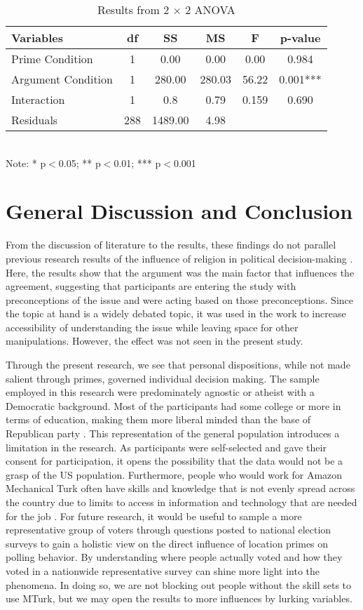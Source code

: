 \documentclass[letterpaper,man,natbib,noextraspace,12pt]{apa6}  %
\newcommand\tb{\textbf}
\begin{document}
\begin{table}
	\caption{Results from 2 $\times$ 2 ANOVA}\label{AnovaResults}
	\begin{tabular}{lccccc}
		\hline
		\tb{Variables}&\tb{df}&\tb{SS}&\tb{MS}&\tb{F}&\tb{p-value}\\
		\hline
		Prime Condition&1&0.00&0.00&0.00&0.984\\
		Argument Condition&1&280.00&280.03&56.22&0.001***\\
		Interaction&1&0.8&0.79&0.159&0.690\\
		Residuals&288&1489.00&4.98&&\\
		\hline
	\end{tabular}\\
	Note: * p$<$0.05; ** p$<$0.01; *** p$<$0.001
\end{table}

\section{General Discussion and Conclusion}

From the discussion of literature to the results, these findings do not parallel previous research results of the influence of religion in political decision-making \citep{calfano_god_2009, rutchick_deus_2010}. Here, the results show that the argument was the main factor that influences the agreement, suggesting that participants are entering the study with preconceptions of the issue and were acting based on those preconceptions. Since the topic at hand is a widely debated topic, it was used in the \cite{suhay_role_2018} work to increase accessibility of understanding the issue while leaving space for other manipulations. However, the effect was not seen in the present study.

Through the present research, we see that personal dispositions, while not made salient through primes, governed individual decision making. The sample employed in this research were predominately agnostic or atheist with a Democratic background. Most of the participants had some college or more in terms of education, making them more liberal minded than the base of Republican party \citep{gelman_red_2010}. This representation of the general population introduces a limitation in the research. As participants were self-selected and gave their consent for participation, it opens the possibility that the data would not be a grasp of the US population. Furthermore, people who would work for Amazon Mechanical Turk often have skills and knowledge that is not evenly spread across the country due to limits to access in information and technology that are needed for the job \citep{hochschild2018strangers}. For future research, it would be useful to sample a more representative group of voters through questions posted to national election surveys to gain a holistic view on the direct influence of location primes on polling behavior. By understanding where people actually voted and how they voted in a nationwide representative survey can shine more light into the phenomena. In doing so, we are not blocking out people without the skill sets to use MTurk, but we may open the results to more influences by lurking variables. 
\end{document}
